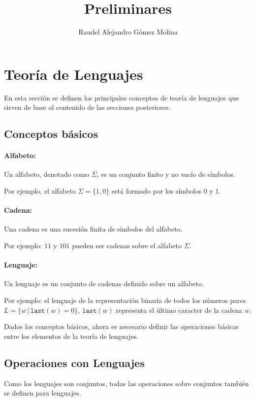 \documentclass[12pt]{article}
\title{Preliminares}
\author{Raudel Alejandro Gómez Molina}
\begin{document}
\maketitle

\section{Teoría de Lenguajes}

En esta sección se definen los principales conceptos de teoría de lenguajes que sirven de base al contenido de las secciones posteriores.

\subsection{Conceptos básicos}

\paragraph{Alfabeto:} Un alfabeto, denotado como $\Sigma$, es un conjunto finito y no vacío de símbolos.

Por ejemplo, el alfabeto $\Sigma=\{1,0\}$ está formado por los símbolos 0 y 1.

\paragraph{Cadena:} Una cadena es una sucesión finita de símbolos del alfabeto.

Por ejemplo: $11$ y $101$ pueden ser cadenas sobre el alfabeto $\Sigma$.

\paragraph{Lenguaje:} Un lenguaje es un conjunto de cadenas definido sobre un alfabeto.

Por ejemplo: el lenguaje de la
representación binaria de todos los números pares $L=\{w\,|\,\texttt{last}(w)=0\}$, $\texttt{last}(w)$
representa el último caracter de la cadena $w$.

Dados los conceptos básicos, ahora es necesario definir las operaciones básicas entre los elementos de la teoría de lenguajes.

\subsection{Operaciones con Lenguajes}

Como los lenguajes son conjuntos, todas las operaciones sobre conjuntos también se definen para lenguajes.
\end{document}

